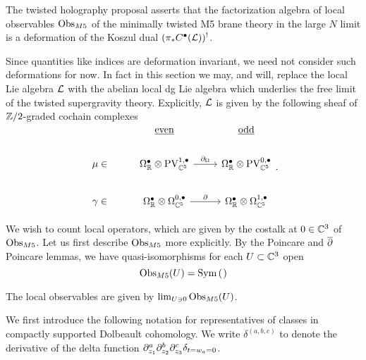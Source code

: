 \documentclass[11pt]{amsart}
\begin{document}
The twisted holography proposal asserts that the factorization algebra of local observables ${\rm Obs}_{M5}$ of the minimally twisted M5 brane theory in the large $N$ limit is a deformation of the Koszul dual $(\pi_{*} C^{\bullet}(\mathcal L))^{!}$.

Since quantities like indices are deformation invariant, we need not consider such deformations for now. In fact in this section we may, and will, replace the local Lie algebra $\mathcal L$ with the abelian local dg Lie algebra which underlies the free limit of the twisted supergravity theory.
Explicitly, $\mathcal L$ is given by the following sheaf of $\mathbb{Z}/2$-graded cochain complexes
\[
\begin{tikzcd}
  &  \ul{\rm even} & \ul{\rm odd} \\
 \mu \in & \Omega^{\bullet}_{\R}\otimes\PV^{1,\bullet}_{\C^{5}} \ar[r, "\del_{\Omega}"] & \Omega^{\bullet}_{\R}\otimes\PV^{0,\bullet}_{\C^{5}}\\
 \gamma \in & \Omega^{\bullet}_{\R}\otimes\Omega^{0,\bullet}_{\C^{5}} \ar[r, "\del"]
& \Omega^{\bullet}_{\R}\otimes\Omega^{1,\bullet}_{\C^{5}}\end{tikzcd}
.\]


\parsec

%

We wish to count local operators, which are given by the costalk at $0\in \mathbb{C}^{3}$ of ${\rm Obs}_{M5}$. Let us first describe ${\rm Obs}_{M5}$ more explicitly. By the Poincare and $\overline{\partial}$ Poincare lemmas, we have quasi-isomorphisms for each $U\subset \mathbb{C}^{3}$ open
\[
\Obs_{M5}(U) = \Sym \left( \begin{tikzcd}  \end{tikzcd} \right)
\]

The local observables are given by $\lim _{U\ni 0} {\rm Obs}_{M5}(U)$.

We first introduce the following notation for representatives of classes in compactly supported Dolbeault cohomology. We write $\delta^{(a,b,c)}$ to denote the derivative of the delta function $\partial_{z_{1}}^{a}\partial_{z_{2}}^{b}\partial_{z_{3}}^{c}\delta_{t=w_{a}=0}$.
\end{document}
